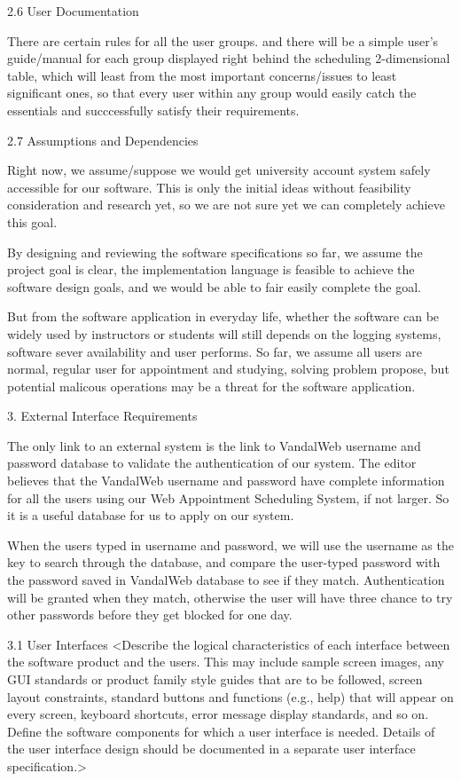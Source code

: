 2.6 User Documentation

There are certain rules for all the user groups. and there will be a simple user's guide/manual for each group displayed right behind the scheduling 2-dimensional table, which will least from the most important concerns/issues to least significant ones, so that every user within any group would easily catch the essentials and succcessfully satisfy their requirements. 

2.7 Assumptions and Dependencies

Right now, we assume/suppose we would get university account system safely accessible for our software. This is only the initial ideas without feasibility consideration and research yet, so we are not sure yet we can completely achieve this goal.

By designing and reviewing the software specifications so far, we assume the project goal is clear, the implementation language is feasible to achieve the software design goals, and we would be able to fair easily complete the goal.
 
But from the software application in everyday life, whether the software can be widely used by instructors or students will still depends on the logging systems, software sever availability and user performs. So far, we assume all users are normal, regular user for appointment and studying, solving problem propose, but potential malicous operations may be a threat for the software application. 



3.	External Interface Requirements

The only link to an external system is the link to VandalWeb username and password database to validate the authentication of our system. The editor believes that the VandalWeb username and password have complete information for all the users using our Web Appointment Scheduling System, if not larger. So it is a useful database for us to apply on our system. 

When the users typed in username and password, we will use the username as the key to search through the database, and compare the user-typed password with the password saved in VandalWeb database to see if they match. Authentication will be granted when they match, otherwise the user will have three chance to try other passwords before they get blocked for one day.  


3.1	User Interfaces
<Describe the logical characteristics of each interface between the software product and the users. This may include sample screen images, any GUI standards or product family style guides that are to be followed, screen layout constraints, standard buttons and functions (e.g., help) that will appear on every screen, keyboard shortcuts, error message display standards, and so on. Define the software components for which a user interface is needed. Details of the user interface design should be documented in a separate user interface specification.>

